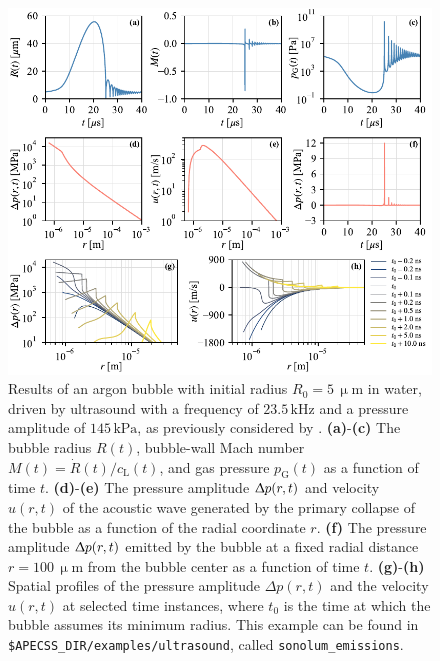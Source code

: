 \begin{figure}
    \centering
    \includegraphics[width=\linewidth]{./figures/emissions_results.pdf}
    \caption{Results of an argon bubble with initial radius $R_0 = 5 \, \upmu \mathrm{m}$ in water, driven by ultrasound with a frequency of $23.5 \, \mathrm{kHz}$ and a pressure amplitude of $145 \, \mathrm{kPa}$, as previously considered by \citet{Holzfuss2010}. {\bf(a)}-{\bf(c)} The bubble radius $R(t)$, bubble-wall Mach number $M(t)=\dot{R}(t)/c_\mathrm{L}(t)$, and gas pressure $p_\mathrm{G}(t)$ as a function of time $t$. {\bf(d)}-{\bf(e)} The pressure amplitude $\Updelta p(r,t)$ and velocity $u(r,t)$  of the acoustic wave generated by the primary collapse of the bubble as a function of the radial coordinate $r$. {\bf (f)} The pressure amplitude $\Updelta p(r,t)$ emitted by the bubble at a fixed radial distance $r=100 \, \upmu \mathrm{m}$ from the bubble center as a function of time $t$. {\bf(g)}-{\bf(h)} Spatial profiles of the pressure amplitude $\Delta p(r,t)$ and the velocity $u(r,t)$ at selected time instances, where $t_0$ is the time at which the bubble assumes its minimum radius. This example can be found in {\tt \$APECSS\_DIR/examples/ultrasound}, called {\tt sonolum\_emissions}.}
    \label{fig:emissions_results}
\end{figure}